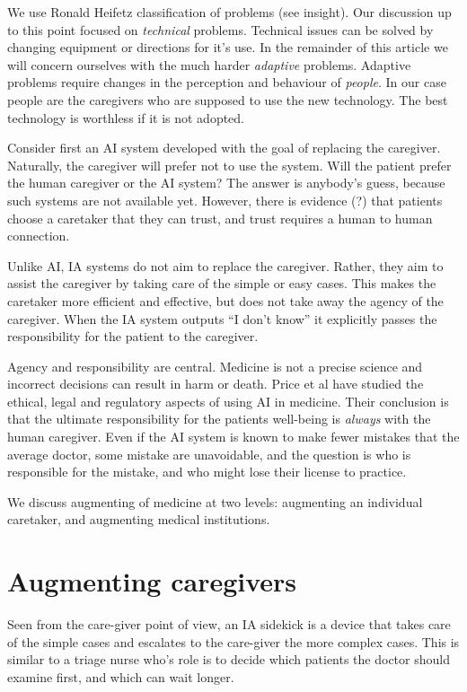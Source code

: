\documentclass[11pt]{pnas-new}
\begin{document}
We use Ronald Heifetz classification of problems (see insight). Our
discussion up to this point focused on {\em technical}
problems. Technical issues can be solved by changing equipment or
directions for it's use. In the remainder of this article we will
concern ourselves with the much harder {\em adaptive}
problems. Adaptive problems require changes in the perception and
behaviour of {\em people}. In our case people are the caregivers who
are supposed to use the new technology. The best technology is
worthless if it is not adopted.

Consider first an AI system developed with the goal of replacing the
caregiver. Naturally, the caregiver will prefer not to use the
system. Will the patient prefer the human caregiver or the AI system?
The answer is anybody's guess, because such systems are not available
yet. However, there is evidence (?) that patients choose a caretaker
that they can trust, and trust requires a human to human connection. 

Unlike AI, IA systems do not aim to replace the caregiver. Rather,
they aim to assist the caregiver by taking care of the simple or easy
cases. This makes the caretaker more efficient and effective, but does
not take away the agency of the caregiver. When the IA system outputs
``I don't know'' it explicitly passes the responsibility for the
patient to the caregiver.

Agency and responsibility are central. Medicine is not a precise
science and incorrect decisions can result in harm or death.
Price et al have studied the ethical, legal and regulatory
aspects of using AI in medicine.\cite{price2014black,ford2016privacy, ford2017regulating}
Their conclusion is that the ultimate responsibility for the patients
well-being is {\em always} with the human caregiver. Even if the AI
system is known to make fewer mistakes that the average doctor, some
mistake are unavoidable, and the question is who is responsible for
the mistake, and who might lose their license to practice.

We discuss augmenting of medicine at two levels: augmenting an
individual caretaker, and augmenting medical institutions.

\section{Augmenting caregivers}



Seen from the care-giver point of view, an IA sidekick is a device
that takes care of the simple cases and escalates to the care-giver
the more complex cases. This is similar to a triage nurse who's role
is to decide which patients the doctor should examine first, and which
can wait longer.
\end{document}
